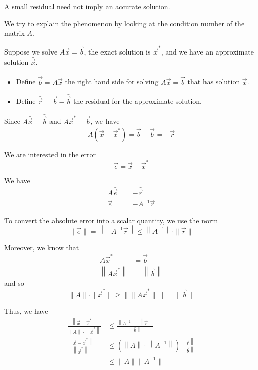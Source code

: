 \begin{remark}
    A small residual need not imply an accurate solution.
\end{remark}

We try to explain the phenomenon by looking at the condition number of the matrix \( A \).

Suppose we solve \( A\vec{x} = \vec{b} \), the exact solution is \( \vec{x}^* \), and we have an approximate solution \( \bar{\vec{x}} \).

\begin{itemize}
    \item Define \( \bar{\vec{b}} = A \bar{\vec{x}} \) the right hand side for solving \( A \vec{x} = \vec{b} \) that has solution \( \bar{\vec{x}} \).

    \item Define \( \bar{\vec{r}} = \vec{b} - \bar{\vec{b}} \) the residual for the approximate solution.
\end{itemize}

Since \( A \bar{\vec{x}} = \bar{\vec{b}} \) and \( A \vec{x}^* = \vec{b} \), we have \[
    A(\bar{\vec{x}} - \vec{x}^*) = \bar{\vec{b}} - \vec{b} = -\bar{\vec{r}}
\]

We are interested in the error \[
    \bar{\vec{e}} = \bar{\vec{x}} - \vec{x}^*
\]

We have \begin{align*}
    A \bar{\vec{e}} & = -\bar{\vec{r}}        \\
    \bar{\vec{e}}   & = -A^{-1} \bar{\vec{r}}
\end{align*}

To convert the absolute error into a scalar quantity, we use the norm \[
    \| \bar{\vec{e}} \| = \left\| -A^{-1} \bar{\vec{r}} \right\| \leq \left\| A^{-1} \right\| \cdot \| \bar{\vec{r}} \|
\]

Moreover, we know that \begin{align*}
    A \vec{x}^*                  & = \vec{b}                  \\
    \left\| A \vec{x}^* \right\| & = \left\| \vec{b} \right\|
\end{align*} and so \[
    \| A \| \cdot \| \vec{x}^* \| \geq \| \| A \vec{x}^* \| \| = \| \vec{b} \|
\]

Thus, we have \begin{align*}
    \frac{\left\| \bar{\vec{x}} - \vec{x}^* \right\|}{\left\| A \right\| \cdot \left\| \vec{x}^* \right\|}
     & \leq \frac{\left\| A^{-1} \right\| \cdot \left\| \bar{\vec{r}} \right\|}{\left\| \bar{b} \right\|}                                   \\
    \frac{\left\| \bar{\vec{x}} - \vec{x}^* \right\|}{\left\| \vec{x}^* \right\|}
     & \leq \left( \left\| A \right\| \cdot \left\| A^{-1} \right\| \right) \frac{\left\| \bar{\vec{r}} \right\|}{\left\| \vec{b} \right\|} \\
     & \leq \| A \| \| A^{-1} \|
\end{align*}

